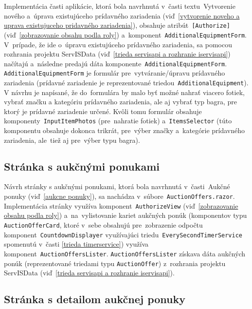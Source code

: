 Implementácia časti aplikácie, ktorá bola navrhnutá v~časti textu~Vytvorenie nového a~úprava existujúceho prídavného zariadenia (viď~\ref{vytvorenie noveho a uprava existujuceho pridavného zariadenia}), obsahuje atribút~\verb|[Authorize]| (viď~\ref{zobrazovanie obsahu podla roly}) a~komponent~\verb|AdditionalEquipmentForm|. V~prípade, že ide o~úpravu existujúceho prídavného zariadenia, sa pomocou rozhrania projektu ServISData (viď~\ref{trieda servisapi a rozhranie iservisapi}) načítajú a~následne predajú dáta komponente~\verb|AdditionalEquipmentForm|. \verb|AdditionalEquipmentForm| je formulár pre~vytváranie/úpravu prídavného zariadenia (prídavné zariadenie je reprezentované triedou~\verb|AdditionalEquipment|). V návrhu je napísané, že do~formulára by malo byť možné nahrať viacero fotiek, vybrať značku a kategóriu prídavného zariadenia, ale aj vybrať typ bagra, pre ktorý je prídavné zariadenie určené. Kvôli tomu formulár obsahuje komponenty~\verb|InputItemPhotos| (pre~nahratie fotiek) a~\verb|ItemsSelector| (túto komponentu obsahuje dokonca trikrát, pre~výber značky a~kategórie prídavného zariadenia, ale~tiež aj pre~výber typu bagra).

\subsection{Stránka s aukčnými ponukami}

Návrh stránky s aukčnými ponukami, ktorá bola navrhnutá v~časti~Aukčné ponuky (viď~\ref{aukcne ponuky}), sa nachádza v~súbore~\verb|AuctionOffers.razor|. Implementácia stránky využíva komponent~\verb|AuthorizeView| (viď~\ref{zobrazovanie obsahu podla roly}) a~na~vylistovanie kariet aukčných ponúk (komponentov typu \verb|AuctionOfferCard|, ktoré v~sebe obsahujú pre~zobrazenie odpočtu komponent~\verb|CountdownDisplayer| využívajúci triedu~\verb|EverySecondTimerService| spomenutú v~časti \ref{trieda timerservice}) využíva komponent~\verb|AuctionOffersLister|. \verb|AuctionOffersLister| získava dáta aukčných ponúk (reprezentované triedami typu \verb|AuctionOffer|) z~rozhrania projektu ServISData (viď~\ref{trieda servisapi a rozhranie iservisapi}).

\subsection{Stránka s detailom aukčnej ponuky}

